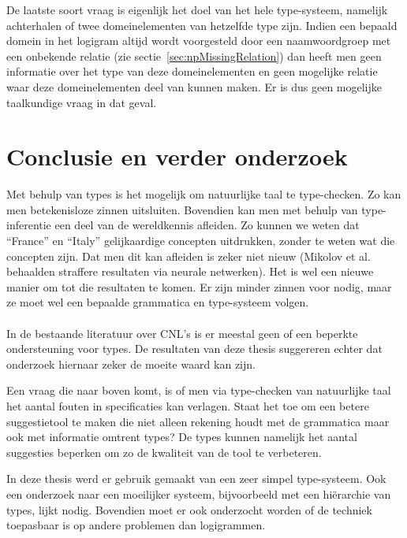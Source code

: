 De laatste soort vraag is eigenlijk het doel van het hele type-systeem, namelijk achterhalen of twee domeinelementen van hetzelfde type zijn. Indien een bepaald domein in het logigram altijd wordt voorgesteld door een naamwoordgroep met een onbekende relatie (zie sectie~\ref{sec:npMissingRelation}) dan heeft men geen informatie over het type van deze domeinelementen en geen mogelijke relatie waar deze domeinelementen deel van kunnen maken. Er is dus geen mogelijke taalkundige vraag in dat geval.

\section{Conclusie en verder onderzoek}
Met behulp van types is het mogelijk om natuurlijke taal te type-checken. Zo kan men betekenisloze zinnen uitsluiten. Bovendien kan men met behulp van type-inferentie een deel van de wereldkennis afleiden. Zo kunnen we weten dat ``France'' en ``Italy'' gelijkaardige concepten uitdrukken, zonder te weten wat die concepten zijn. Dat men dit kan afleiden is zeker niet nieuw (Mikolov et al. \cite{Mikolov2013} behaalden straffere resultaten via neurale netwerken). Het is wel een nieuwe manier om tot die resultaten te komen. Er zijn minder zinnen voor nodig, maar ze moet wel een bepaalde grammatica en type-systeem volgen.

\paragraph{} In de bestaande literatuur over CNL's is er meestal geen of een beperkte ondersteuning voor types. De resultaten van deze thesis suggereren echter dat onderzoek hiernaar zeker de moeite waard kan zijn.

Een vraag die naar boven komt, is of men via type-checken van natuurlijke taal het aantal fouten in specificaties kan verlagen. Staat het toe om een betere suggestietool te maken die niet alleen rekening houdt met de grammatica maar ook met informatie omtrent types? De types kunnen namelijk het aantal suggesties beperken om zo de kwaliteit van de tool te verbeteren.

In deze thesis werd er gebruik gemaakt van een zeer simpel type-systeem. Ook een onderzoek naar een moeilijker systeem, bijvoorbeeld met een hiërarchie van types, lijkt nodig. Bovendien moet er ook onderzocht worden of de techniek toepasbaar is op andere problemen dan logigrammen.
